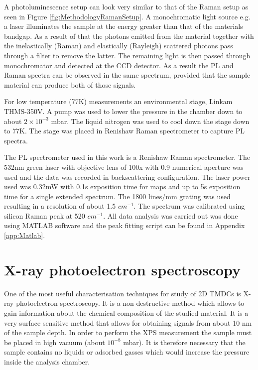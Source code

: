 A photoluminescence setup can look very similar to that of the Raman setup as seen in Figure \ref{fig:MethodologyRamanSetup}. A monochromatic light source e.g. a laser illuminates the sample at the energy greater than that of the materials bandgap. As a result of that the photons emitted from the material together with the inelastically (Raman) and elastically (Rayleigh) scattered photons pass through a filter to remove the latter. The remaining light is then passed through monochromator and detected at the CCD detector. As a result the PL and Raman spectra can be observed in the same spectrum, provided that the sample material can produce both of those signals. 

For low temperature (77K) measurements an environmental stage, Linkam THMS-350V. A pump was used to lower the pressure in the chamber down to about $2 \times 10^{-3}$ mbar. The liquid nitrogen was used to cool down the stage down to 77K. The stage was placed in Renishaw Raman spectrometer to capture PL spectra.

The PL spectrometer used in this work is a Renishaw Raman spectrometer. The 532nm green laser with objective lens of 100x with 0.9 numerical aperture was used and the data was recorded in backscattering configuration. The laser power used was 0.32mW with 0.1s exposition time for maps and up to 5s exposition time for a single extended spectrum. The 1800 lines/mm grating was used resulting in a resolution of about 1.5 $cm^{-1}$. The spectrum was calibrated using silicon Raman peak at 520 $cm^{-1}$. All data analysis was carried out was done using MATLAB software and the peak fitting script can be found in Appendix \ref{app:Matlab}.

\section{X-ray photoelectron spectroscopy}

One of the most useful characterisation techniques for study of 2D TMDCs is X-ray photoelectron spectroscopy. It is a non-destructive method which allows to gain information about the chemical composition of the studied material. It is a very surface sensitive method that allows for obtaining signals from about 10 nm of the sample depth. In order to perform the XPS measurement the sample must be placed in high vacuum (about $10^{-8}$ mbar). It is therefore necessary that the sample contains no liquids or adsorbed gasses which would increase the pressure inside the analysis chamber. 

